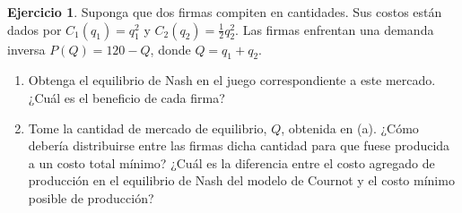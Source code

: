 \documentclass[a4paper, 11pt]{article}
\theoremstyle{definition}
\newtheorem{ejercicio}{Ejercicio}
\begin{document}
\begin{ejercicio} %
Suponga que dos firmas compiten en cantidades. Sus costos están dados
por $C_1(q_1) = q_1^2$ y $C_2(q_2) = \frac{1}{2}q_2^2$. Las firmas enfrentan una demanda inversa $P(Q) = 120-Q$, donde $Q = q_1 + q_2$.

\begin{enumerate}[label=(\alph*)]
\item Obtenga el equilibrio de Nash en el juego correspondiente a este mercado. ¿Cuál es el beneficio de cada firma?
\item Tome la cantidad de mercado de equilibrio, $Q$, obtenida en (a).
¿Cómo debería distribuirse entre las firmas dicha cantidad para que fuese producida a un costo total mínimo? ¿Cuál es la diferencia entre el costo agregado de producción en el equilibrio de Nash del modelo de Cournot y el costo mínimo posible de producción?
\end{enumerate}
\end{ejercicio}
\end{document}
